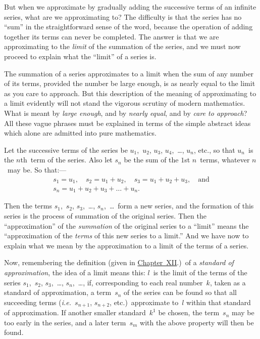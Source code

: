 \documentclass[12pt,leqno]{book}[2005/09/16]
\newcommand{\Chg}[2]{#2}
\newcommand{\Add}[1]{\Chg{}{#1}}
\newcommand{\ChapRef}[2][Chapter]{\hyperref[chapter:#2]{\Chg{#1}{Chapter}~#2}}
\newcommand{\PageSep}[1]{\ignorespaces}
\newcommand{\ie}{\emph{i.e.}}
\begin{document}
But when we approximate by gradually
%
adding the successive terms of an infinite
series, what are we approximating to? The
difficulty is that the series has no ``sum'' in
the straightforward sense of the word, because
the operation of adding together its terms
can never be completed. The answer is that
we are approximating to the \emph{limit} of the
summation of the series, and we must now
\PageSep{200}
proceed to explain what the ``limit'' of a
series is.

The summation of a series approximates to
a limit when the sum of any number of its
terms, provided the number be large enough,
is as nearly equal to the limit as you care to
approach. But this description of the meaning
of approximating to a limit evidently will
not stand the vigorous scrutiny of modern
mathematics. What is meant by \emph{large
enough}, and by \emph{nearly equal}, and by \emph{care to
approach}? All these vague phrases must be
explained in terms of the simple abstract
ideas which alone are admitted into pure
mathematics.

Let the successive terms of the series be
$u_{1}$,~$u_{2}$, $u_{3}$, $u_{4}$,~\dots, $u_{n}$, etc., so that $u_{n}$~is the
$n$th~term of the series. Also let $s_{n}$ be the
sum of the $1$st $n$~terms, whatever $n$~may be.
So that\Add{:}---
\begin{gather*}
s_{1} = u_{1},\quad
s_{2} = u_{1} + u_{2},\quad
s_{3} = u_{1} + u_{2} + u_{3},\quad\text{and} \\
s_{n} = u_{1} + u_{2} + u_{3} + \dots + u_{n}.
\end{gather*}

Then the terms $s_{1}$,~$s_{2}$, $s_{3}$,~\dots\Add{,} $s_{n}$,~\dots\ form
a new series, and the formation of this series
is the process of summation of the original
series. Then the ``approximation'' of the
\emph{summation} of the original series to a ``limit''
means the ``approximation of the \emph{terms} of
this new series to a limit.'' And we have
\PageSep{201}
now to explain what we mean by the approximation
to a limit of the terms of a series.

Now, remembering the definition (given in
\ChapRef[chapter]{XII}.)\ of a \emph{standard of approximation},
%
%
the idea of a limit means this: $l$~is
the limit of the terms of the series $s_{1}$,~$s_{2}$,
$s_{3}$,~\dots\Add{,} $s_{n}$,~\dots, if, corresponding to each
real number~$k$, taken as a standard of
approximation, a term~$s_{n}$ of the series can
be found so that all succeeding terms (\ie\
$s_{n+1}$, $s_{n+2}$, etc.)\ approximate to~$l$ within
that standard of approximation. If another
smaller standard~$k^{1}$ be chosen, the term~$s_{n}$
may be too early in the series, and a
later term~$s_{m}$ with the above property will
then be found.
\end{document}
